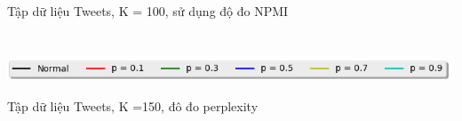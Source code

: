 \documentclass[pdf]{beamer}
\begin{document}
\begin{frame}{Tập dữ liệu Tweets, K = 100, sử dụng độ đo NPMI }
\begin{columns}[T]
\begin{column}{.50\textwidth}
\begin{figure}
	\end{figure}				
\end{column} %
\end{columns}
\begin{center}
\includegraphics[width=1\textwidth]{menu.png}	
\end{center}
\end{frame}


\begin{frame}{Tập dữ liệu Tweets, K =150, đô đo perplexity}
\begin{columns}[T] %
\begin{column}{.50\textwidth}
\begin{figure}
\end{figure}
\end{column} %
\hfill%
\begin{column}{.50\textwidth}
\begin{figure}

\end{figure}
\end{column}
\end{columns}
\end{frame}
\end{document}
